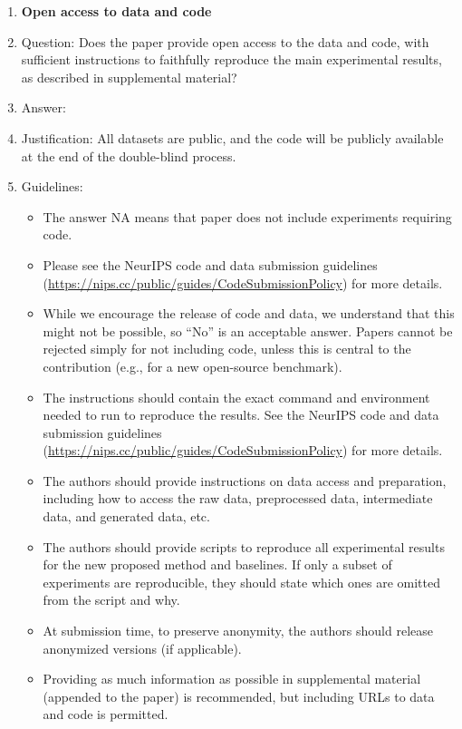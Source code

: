 \documentclass{article}
\begin{document}
\begin{enumerate}
\item {\bf Open access to data and code}
    \item[] Question: Does the paper provide open access to the data and code, with sufficient instructions to faithfully reproduce the main experimental results, as described in supplemental material?
    \item[] Answer: \answerNA{} %
    \item[] Justification: All datasets are public, and the code will be publicly available at the end of the double-blind process.
    \item[] Guidelines:
    \begin{itemize}
        \item The answer NA means that paper does not include experiments requiring code.
        \item Please see the NeurIPS code and data submission guidelines (\url{https://nips.cc/public/guides/CodeSubmissionPolicy}) for more details.
        \item While we encourage the release of code and data, we understand that this might not be possible, so “No” is an acceptable answer. Papers cannot be rejected simply for not including code, unless this is central to the contribution (e.g., for a new open-source benchmark).
        \item The instructions should contain the exact command and environment needed to run to reproduce the results. See the NeurIPS code and data submission guidelines (\url{https://nips.cc/public/guides/CodeSubmissionPolicy}) for more details.
        \item The authors should provide instructions on data access and preparation, including how to access the raw data, preprocessed data, intermediate data, and generated data, etc.
        \item The authors should provide scripts to reproduce all experimental results for the new proposed method and baselines. If only a subset of experiments are reproducible, they should state which ones are omitted from the script and why.
        \item At submission time, to preserve anonymity, the authors should release anonymized versions (if applicable).
        \item Providing as much information as possible in supplemental material (appended to the paper) is recommended, but including URLs to data and code is permitted.
    \end{itemize}



\end{enumerate}
\end{document}
